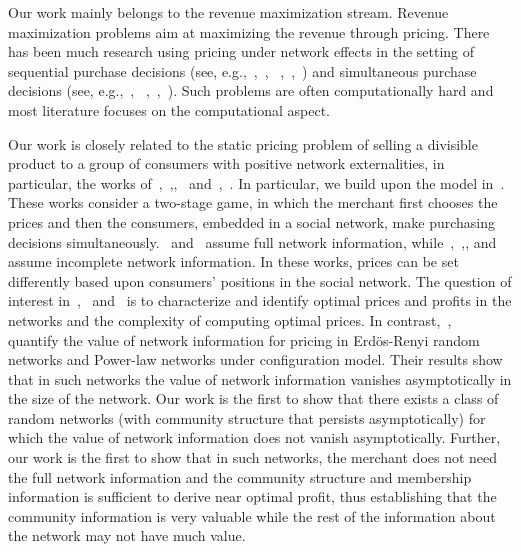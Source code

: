	Our work mainly belongs to the revenue maximization stream. Revenue maximization problems aim at maximizing the revenue through pricing. There has been much research using pricing under
	network effects in
	the setting of sequential purchase decisions
	(see, e.g.,~\cite{hartline2008optimal},~\cite{arthur2009pricing},
~\cite{haghpanah2013optimal},~\cite{crapis2016monopoly},~\cite{zhou2018optimal}) and
	simultaneous purchase decisions (see, e.g.,~\cite{campbell2013word},
~\cite{du2016optimal},~\cite{chen2018competitive},~\cite{cohen2013designing}). Such
	problems are often computationally hard and most literature focuses
	on the computational  aspect.
	
	Our work is closely related to the static pricing problem of selling
	a divisible product to a group of consumers with positive network
	externalities, in particular, the works of~\cite{huang2019value},~\cite{huang2022value},\cite{candogan2012optimal},~\cite{bloch2013pricing} and~\cite{fainmesser2015pricing},~\cite{Baron-2022}. In particular, we build upon the model in~\cite{huang2022value}. These
	works consider a two-stage game, in which the merchant first
	chooses the prices and then the consumers, embedded in a social
	network, make purchasing decisions simultaneously.~\cite{candogan2012optimal} and~\cite{bloch2013pricing} assume full network information, while~\cite{fainmesser2015pricing},~\cite{Baron-2022},\cite{huang2019value}, and~\cite{huang2022value} assume incomplete network information. In
	these works, prices can be set differently based upon consumers'
	positions in the social network. The question of interest in~\cite{candogan2012optimal},~\cite{bloch2013pricing} and~\cite{fainmesser2015pricing} is to
	characterize and identify optimal prices and profits in the networks
	and the complexity of computing optimal prices. In contrast,~\cite{huang2019value},~\cite{huang2022value} quantify the value of network information for pricing in Erd\"{o}s-Renyi random networks and Power-law networks under configuration model. Their results show that in such networks the value of network information vanishes asymptotically in the size of the network. Our work is the first to show that there exists a class of random networks (with community structure that persists asymptotically) for which the value of network information does not vanish asymptotically. Further, our work is the first to show that in such networks, the merchant does not need the full network information and the community structure and membership  information is sufficient to derive near optimal profit, thus establishing that the community information is very valuable while the rest of the information about the network may not have much value.
	
